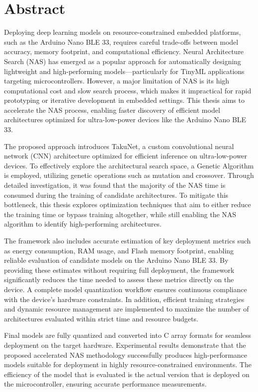 \section*{Abstract}


Deploying deep learning models on resource-constrained embedded platforms, such as the Arduino Nano BLE 33, requires careful trade-offs between model accuracy, memory footprint, and computational efficiency. Neural Architecture Search (NAS) has emerged as a popular approach for automatically designing lightweight and high-performing models—particularly for TinyML applications targeting microcontrollers. However, a major limitation of NAS is its high computational cost and slow search process, which makes it impractical for rapid prototyping or iterative development in embedded settings. This thesis aims to accelerate the NAS process, enabling faster discovery of efficient model architectures optimized for ultra-low-power devices like the Arduino Nano BLE 33.

The proposed approach introduces TakuNet, a custom convolutional neural network (CNN) architecture optimized for efficient inference on ultra-low-power devices. To effectively explore the architectural search space, a Genetic Algorithm is employed, utilizing genetic operations such as mutation and crossover. Through detailed investigation, it was found that the majority of the NAS time is consumed during the training of candidate architectures. To mitigate this bottleneck, this thesis explores optimization techniques that aim to either reduce the training time or bypass training altogether, while still enabling the NAS algorithm to identify high-performing architectures.  

The framework also includes accurate estimation of key deployment metrics such as energy consumption, RAM usage, and Flash memory footprint, enabling reliable evaluation of candidate models on the Arduino Nano BLE 33. By providing these estimates without requiring full deployment, the framework significantly reduces the time needed to assess these metrics directly on the device. A complete model quantization workflow ensures continuous compliance with the device’s hardware constraints. In addition, efficient training strategies and dynamic resource management are implemented to maximize the number of architectures evaluated within strict time and resource budgets. 

Final models are fully quantized and converted into C array formats for seamless deployment on the target hardware. Experimental results demonstrate that the proposed accelerated NAS methodology successfully produces high-performance models suitable for deployment in highly resource-constrained environments. The efficiency of the model that is evaluated is the actual version that is deployed on the microcontroller, ensuring accurate performance measurements.






